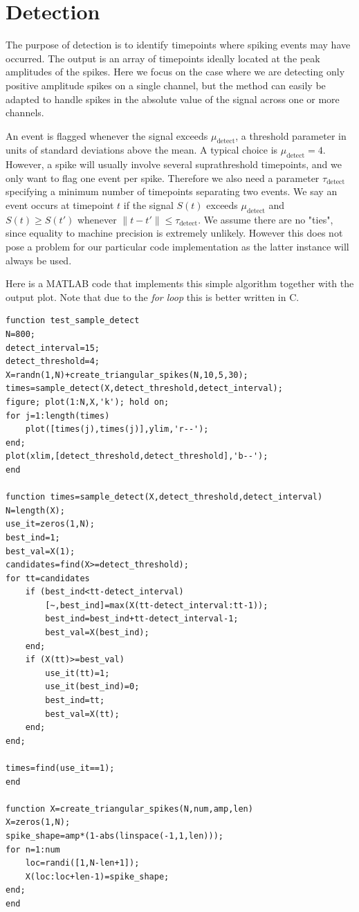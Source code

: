 \documentclass{article}
\begin{document}
\section{Detection}

The purpose of detection is to identify timepoints where spiking events may have occurred. The output is an array of timepoints ideally located at the peak amplitudes of the spikes. Here we focus on the case where we are detecting only positive amplitude spikes on a single channel, but the method can easily be adapted to handle spikes in the absolute value of the signal across one or more channels.

An event is flagged whenever the signal exceeds $\mu_{\text{detect}}$, a threshold parameter in units of standard deviations above the mean. A typical choice is $\mu_{\text{detect}}=4$. However, a spike will usually involve several suprathreshold timepoints, and we only want to flag one event per spike. Therefore we also need a parameter $\tau_{\text{detect}}$ specifying a minimum number of timepoints separating two events. We say an event occurs at timepoint $t$ if the signal $S(t)$ exceeds
$\mu_{\text{detect}}$ and $S(t)\geq S(t')$ whenever $\|t-t'\|\leq \tau_{\text{detect}}$. We assume there are no "ties", since equality to machine precision is extremely unlikely. However this does not pose a problem for our particular code implementation as the latter instance will always be used.

Here is a MATLAB code that implements this simple algorithm together with the output plot. Note that due to the \emph{for loop} this is better written in C.

\begin{lstlisting}
function test_sample_detect
N=800;
detect_interval=15;
detect_threshold=4;
X=randn(1,N)+create_triangular_spikes(N,10,5,30);
times=sample_detect(X,detect_threshold,detect_interval);
figure; plot(1:N,X,'k'); hold on;
for j=1:length(times)
    plot([times(j),times(j)],ylim,'r--');
end;
plot(xlim,[detect_threshold,detect_threshold],'b--');
end

function times=sample_detect(X,detect_threshold,detect_interval)
N=length(X);
use_it=zeros(1,N);
best_ind=1;
best_val=X(1);
candidates=find(X>=detect_threshold);
for tt=candidates
    if (best_ind<tt-detect_interval)
        [~,best_ind]=max(X(tt-detect_interval:tt-1));
        best_ind=best_ind+tt-detect_interval-1;
        best_val=X(best_ind);
    end;
    if (X(tt)>=best_val)
        use_it(tt)=1;
        use_it(best_ind)=0;
        best_ind=tt;
        best_val=X(tt);
    end;
end;

times=find(use_it==1);
end

function X=create_triangular_spikes(N,num,amp,len)
X=zeros(1,N);
spike_shape=amp*(1-abs(linspace(-1,1,len)));
for n=1:num
    loc=randi([1,N-len+1]);
    X(loc:loc+len-1)=spike_shape;
end;
end
\end{lstlisting}
\end{document}
